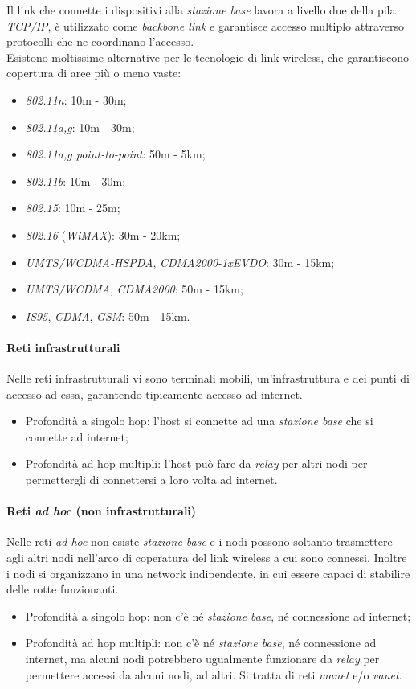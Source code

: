 Il link che connette i dispositivi alla \textit{stazione base} lavora a livello due della pila \textit{TCP/IP}, è utilizzato come \textit{backbone link} e garantisce accesso multiplo attraverso protocolli che ne coordinano l'accesso. \\
Esistono moltissime alternative per le tecnologie di link wireless, che garantiscono copertura di aree più o meno vaste:
\begin{itemize}
	\item \textit{802.11n}: 10m - 30m;
	\item \textit{802.11a,g}: 10m - 30m;
	\item \textit{802.11a,g point-to-point}: 50m - 5km;
	\item \textit{802.11b}: 10m - 30m;
	\item \textit{802.15}: 10m - 25m;
	\item \textit{802.16} (\textit{WiMAX}): 30m - 20km;
	\item \textit{UMTS/WCDMA-HSPDA}, \textit{CDMA2000-1xEVDO}: 30m - 15km;
	\item \textit{UMTS/WCDMA}, \textit{CDMA2000}: 50m - 15km;
	\item \textit{IS95}, \textit{CDMA}, \textit{GSM}: 50m - 15km.
\end{itemize}

\paragraph{Reti infrastrutturali}
Nelle reti infrastrutturali vi sono terminali mobili, un'infrastruttura e dei punti di accesso ad essa, garantendo tipicamente accesso ad internet.
\begin{itemize}
	\item Profondità a singolo hop: l'host si connette ad una \textit{stazione base} che si connette ad internet;
	\item Profondità ad hop multipli: l'host può fare da \textit{relay} per altri nodi per permettergli di connettersi a loro volta ad internet.
\end{itemize}

\paragraph{Reti \textit{ad hoc} (non infrastrutturali)}
Nelle reti \textit{ad hoc} non esiste \textit{stazione base} e i nodi possono soltanto trasmettere agli altri nodi nell'arco di coperatura del link wireless a cui sono connessi. Inoltre i nodi si organizzano in una network indipendente, in cui essere capaci di stabilire delle rotte funzionanti.
\begin{itemize}
	\item Profondità a singolo hop: non c'è né \textit{stazione base}, né connessione ad internet;
	\item Profondità ad hop multipli: non c'è né \textit{stazione base}, né connessione ad internet, ma alcuni nodi potrebbero ugualmente funzionare da \textit{relay} per permettere accessi da alcuni nodi, ad altri. Si tratta di reti \textit{manet} e/o \textit{vanet}.
\end{itemize}

